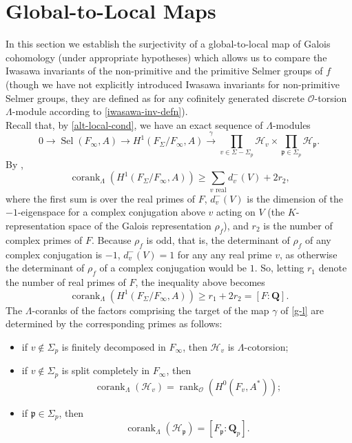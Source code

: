 \documentclass[12 pt]{amsart}
\theoremstyle{plain}
\theoremstyle{definition}
\numberwithin{equation}{section}
\numberwithin{table}{section}
\begin{document}
\section{Global-to-Local Maps}
\label{global-to-local}
\indent In this section we establish the surjectivity of a global-to-local map of Galois cohomology (under appropriate hypotheses) which allows us to compare the Iwasawa invariants of the non-primitive and the primitive Selmer groups of $f$ (though we have not explicitly introduced Iwasawa invariants for non-primitive Selmer groups, they are defined as for any cofinitely generated discrete $\mathscr{O}$-torsion $\Lambda$-module according to \cref{iwasawa-inv-defn}).\\%
\indent Recall that, by \cref{alt-local-cond}, we have an exact sequence of $\Lambda$-modules
\begin{equation}
\label{g-l}
0\rightarrow\operatorname{Sel}(F_\infty,A)\rightarrow H^1(F_\Sigma/F_\infty,A)\xrightarrow{\gamma}\prod_{v\in\Sigma-\Sigma_p}\mathcal{H}_v\times\prod_{\mathfrak{p}\in\Sigma_p}
\mathcal{H}_\mathfrak{p}\text{.}
\end{equation}
By \cite[Proposition 3]{GR89},
\begin{equation*}
\operatorname{corank}_\Lambda(H^1(F_\Sigma/F_\infty,A))\geq \sum_{v\text{ real}}d_v^-(V)+2r_2\text{,}
\end{equation*}
where the first sum is over the real primes of $F$, $d_v^-(V)$ is the dimension of the $-1$-eigenspace for a complex conjugation above $v$ acting on $V$ (the $K$-representation space of the Galois representation $\rho_f$), and $r_2$ is the number of complex primes of $F$. Because $\rho_f$ is odd, that is, the determinant of $\rho_f$ of any complex conjugation is $-1$, $d_v^-(V)=1$ for any any real prime $v$, as otherwise the determinant of $\rho_f$ of a complex conjugation would be $1$. So, letting $r_1$ denote the number of real primes of $F$, the inequality above becomes
\begin{equation*}
\operatorname{corank}_\Lambda(H^1(F_\Sigma/F_\infty,A))\geq r_1+2r_2=[F:\mathbf{Q}]\text{.}
\end{equation*}
\indent The $\Lambda$-coranks of the factors comprising the target of the map $\gamma$ of \cref{g-l} are determined by the corresponding primes as follows:
\begin{itemize}
\item if $v\notin\Sigma_p$ is finitely decomposed in $F_\infty$, then $\mathcal{H}_v$ is $\Lambda$-cotorsion;
\item if $v\notin\Sigma_p$ is split completely in $F_\infty$, then
\begin{equation*}
\operatorname{corank}_\Lambda(\mathcal{H}_v)=\operatorname{rank}_\mathscr{O}(H^0(F_v,A^*))\text{;}
\end{equation*}
\item if $\mathfrak{p}\in\Sigma_p$, then
\begin{equation*}
\operatorname{corank}_\Lambda(\mathcal{H}_\mathfrak{p})=[F_\mathfrak{p}:\mathbf{Q}_p]\text{.}
\end{equation*}
\end{itemize}
\end{document}
